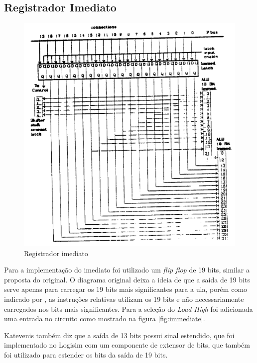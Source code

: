 \documentclass[
	article,			%
	11pt,				%
	oneside,			%
	a4paper,			%
	english,			%
	brazil,				%
	sumario=tradicional
	]{abntex2}
\begin{document}
\subsection{Registrador Imediato}
\begin{figure}[H]
    \centering
    \includegraphics[width=0.75\linewidth]{Original/immediatePeek.png}
    \caption{Registrador imediato\cite{peek_vlsi_1983}}
    \label{fig:immediatePeek}    
\end{figure}
Para a implementação do imediato foi utilizado um \textit{flip flop} de 19 bits, similar a proposta do original. O diagrama original deixa a ideia de que a saída de 19 bits serve apenas para carregar os 19 bits mais significantes para a ula, porém como indicado por , as instruções relativas utilizam os 19 bits e não necessariamente carregados nos bits mais significantes. Para a seleção do\textit{ Load High} foi adicionada uma entrada no circuito como mostrado na figura \ref{fig:immediate}.

Katevenis também diz que a saída de 13 bits possui sinal estendido, que foi implementado no Logisim com um componente de extensor de bits, que também foi utilizado para estender os bits da saída de 19 bits. 
\end{document}
